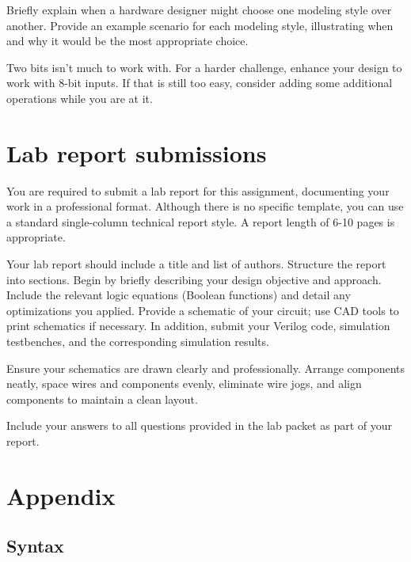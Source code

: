 \documentclass[12pt]{labmanual}
\begin{document}
\begin{question}
    Briefly explain when a hardware designer might choose one modeling style over another. Provide an example scenario for each modeling style, illustrating when and why it would be the most appropriate choice.
\end{question}

\begin{bonusquestion}
    Two bits isn't much to work with. For a harder challenge, enhance your design to work with 8-bit inputs. If that is still too easy, consider adding some additional operations while you are at it.
\end{bonusquestion}

\section{Lab report submissions}

You are required to submit a lab report for this assignment, documenting your work in a professional format. Although there is no specific template, you can use a standard single-column technical report style. A report length of 6-10 pages is appropriate.

Your lab report should include a title and list of authors. Structure the report into sections. Begin by briefly describing your design objective and approach. Include the relevant logic equations (Boolean functions) and detail any optimizations you applied. Provide a schematic of your circuit; use CAD tools to print schematics if necessary. In addition, submit your Verilog code, simulation testbenches, and the corresponding simulation results.

Ensure your schematics are drawn clearly and professionally. Arrange components neatly, space wires and components evenly, eliminate wire jogs, and align components to maintain a clean layout.

Include your answers to all questions provided in the lab packet as part of your report.

\clearpage
\section{Appendix}
\label{sec:appendix}
\subsection{Syntax}
\end{document}

